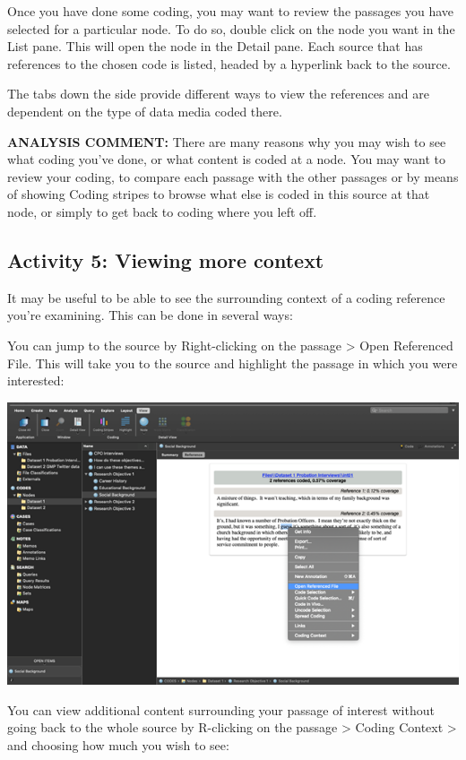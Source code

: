 \documentclass[
]{book}
\begin{document}
Once you have done some coding, you may want to review the passages you have selected for a particular node. To do so, double click on the node you want in the List pane. This will open the node in the Detail pane. Each source that has references to the chosen code is listed, headed by a hyperlink back to the source.

The tabs down the side provide different ways to view the references and are dependent on the type of data media coded there.

\textbf{ANALYSIS COMMENT:} There are many reasons why you may wish to see what coding you've done, or what content is coded at a node. You may want to review your coding, to compare each passage with the other passages or by means of showing Coding stripes to browse what else is coded in this source at that node, or simply to get back to coding where you left off.

\hypertarget{activity-5-viewing-more-context}{%
\subsection{Activity 5: Viewing more context}\label{activity-5-viewing-more-context}}

It may be useful to be able to see the surrounding context of a coding reference you're examining. This can be done in several ways:

You can jump to the source by Right-clicking on the passage \textgreater{} Open Referenced File. This will take you to the source and highlight the passage in which you were interested:

\includegraphics{imgs/open_ref_file.png}

You can view additional content surrounding your passage of interest without going back to the whole source by R-clicking on the passage \textgreater{} Coding Context \textgreater{} and choosing how much you wish to see:
\end{document}
